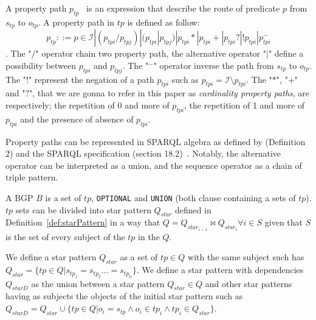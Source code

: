 \begin{definition}\label{def:propertyPath}
   A property path $p_{tp}$~\cite{Kostylev2015} is an expression that describe the route of predicate $p$ from $s_{tp}$ to $o_{tp}$.
   A property path in $tp$ is defined as follow:
   \begin{equation}
    p_{tp} ::= p \in \mathcal{I} | (p_{tpi}/p_{tpj}) | (p_{tpi}|p_{tpj}) | p_{tpi}* | p_{tpi}+ | p_{tpi}? | !p_{tpi}| p_{tpi}^{-}
   \end{equation}.
   The "$/$" operator chain two property path, the alternative operator "$|$" define a possibility between $p_{tpi}$ and $p_{tpj}$.
   The "$^-$" operator inverse the path from $s_{tp}$ to $o_{tp}$.
   The "$!$" represent the negation of a path $p_{tpi}$ such as $p_{tpi} = \mathcal{I} \setminus p_{tpi}$.
   The "$*$", "$+$" and "$?$", that we are gonna to refer in this paper as \emph{cardinality property paths}, are respectively; the repetition of 0 and more of $p_{tpi}$, 
   the repetition of 1 and more of $p_{tpi}$ and the presence of absence of $p_{tpi}$.
\end{definition}

Property paths can be represented in SPARQL algebra as defined by \citeauthor{Kostylev2015} (Definition 2) and the SPARQL specification (section 18.2)~.
Notably, the alternative operator can be interpreted as a union, and the sequence operator as a chain of triple pattern.

\begin{definition}[BGP]\label{def:bgp}
 A BGP $B$ is a set of $tp$, \texttt{OPTIONAL} and \texttt{UNION} (both clause containing a sets of $tp$).
 $tp$ sets can be divided into star pattern $Q_{star}$ defined in Definition~\ref{def:starPattern} in a way 
 that $Q = Q_{star_{i-1}} \bowtie Q_{star_i} \forall i \in S$ given that $S$ is the set of every subject of the $tp$ in the $Q$.
\end{definition}


\begin{definition}\label{def:starPattern}
We define a star pattern $Q_{star}$ as a set of $tp \in Q$ with the same subject such has $Q_{star} = \{ tp\in Q| s_{tp_1} = s_{tp_2} ... = s_{tp_n}\}$.
We define a star pattern with dependencies $Q_{starD}$ as the union between a star pattern $Q_{star} \in Q$ and other star patterns having as subjects
the objects of the initial star pattern such as $Q_{starD} = Q_{star} \cup \{tp \in Q| o_{i} = s_{tp} \land o_{i}\in tp_i \land tp_i  \in Q_{star}\}$.
\end{definition}

